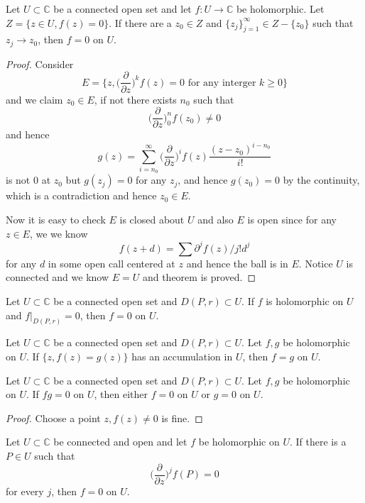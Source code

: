 \documentclass[lang=en, color=blue, ]{elegantbook}
\newcommand{\C}{\mathbb{C}}
\newcommand{\ParZ}{\dfrac{\partial}{\partial z}}
\begin{document}
\begin{theorem}
    Let $U\subset \C$ be a connected open set and let $f:U\to\C$ be holomorphic. Let $Z = \{z\in U, f(z) = 0\}$. If there are a $z_0\in Z$ and $\{z_j\}_{j=1}^{\infty} \in Z-\{z_0\}$ such that $z_j \to z_0$, then $f=0$ on $U$.
\end{theorem}
\begin{proof}\par
    Consider
    \[E = \{z, \Big(\ParZ\Big)^kf(z) = 0\text{ for any interger } k\geq 0\}\]
    and we claim $z_0 \in E$, if not there exists $n_0$ such that
    \[
    \Big(\ParZ\Big)^n_0 f(z_0) \neq 0
    \]
    and hence
    \[
    g(z) = \sum\limits_{i=n_0}^{\infty} \Big(\ParZ\Big)^i f(z)\dfrac{(z-z_0)^{i-n_0}}{i!}
    \]
    is not $0$ at $z_0$ but $g(z_j) = 0$ for any $z_j$, and hence $g(z_0) = 0$ by the continuity, which is a contradiction and hence $z_0 \in E$.\par
    Now it is easy to check $E$ is closed about $U$ and also $E$ is open since for any $z\in E$, we we know
    \[
    f(z+d) = \sum \partial^{j}f(z)/j! d^j
    \]
    for any $d$ in some open call centered at $z$ and hence the ball is in $E$. Notice $U$ is connected and we know $E = U$ and theorem is proved.
\end{proof}

\begin{corollary}
    Let $U\subset \C$ be a connected open set and $D(P,r)\subset U$. If $f$ is holomorphic on $U$ and $f|_{D(P,r)} = 0$, then $f= 0$ on $U$.
\end{corollary}

\begin{corollary}
    Let $U\subset \C$ be a connected open set and $D(P,r)\subset U$. Let $f,g$ be holomorphic on $U$. If $\{z,f(z)=g(z)\}$ has an accumulation in $U$, then $f=g$ on $U$.
\end{corollary}

\begin{corollary}
    Let $U\subset \C$ be a connected open set and $D(P,r)\subset U$. Let $f,g$ be holomorphic on $U$. If $fg = 0$ on $U$, then either $f=0$ on $U$ or $g=0$ on $U$.
\end{corollary}
\begin{proof} Choose a point $z,f(z)\neq 0$ is fine.
\end{proof}

\begin{corollary}
    Let $U\subset\C$ be connected and open and let $f$ be holomorphic on $U$. If there is a $P\in U$ such that
    \[
    \Big(\ParZ\Big)^j f(P) = 0
    \]
    for every $j$, then $f = 0$ on $U$.
\end{corollary}
\end{document}
